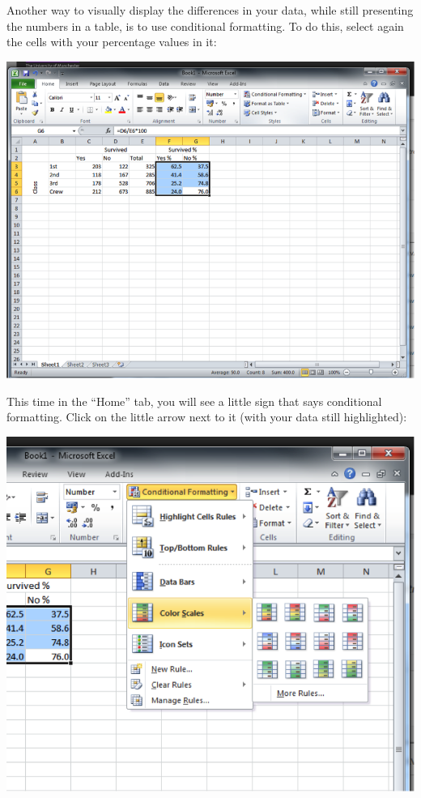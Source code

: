 \documentclass[
]{book}
\begin{document}
Another way to visually display the differences in your data, while still presenting the numbers in a table, is to use conditional formatting. To do this, select again the cells with your percentage values in it:

\includegraphics{imgs/cond_form.png}

This time in the ``Home'' tab, you will see a little sign that says conditional formatting. Click on the little arrow next to it (with your data still highlighted):

\includegraphics{imgs/cond_form_2.png}
\end{document}
